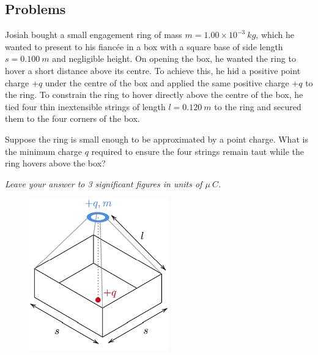 \subsection*{Problems}
\begin{prbm}
Josiah bought a small engagement ring of mass $m = 1.00 \times 10^{-3}\:\unit{kg}$, which he wanted to present to his fianc\'{e}e in a box with a square base of side length $s=0.100\:\unit{m}$ and negligible height. On opening the box, he wanted the ring to hover a short distance above its centre. To achieve this, he hid a positive point charge $+q$ under the centre of the box and applied the same positive charge $+q$ to the ring. To constrain the ring to hover directly above the centre of the box, he tied four thin inextensible strings of length $l=0.120\:\unit{m}$ to the ring and secured them to the four corners of the box. 

Suppose the ring is small enough to be approximated by a point charge. What is the minimum charge $q$ required to ensure the four strings remain taut while the ring hovers above the box?

\textit{Leave your answer to 3 significant figures in units of $\mu\:\unit{C}$.}

\begin{figure}[H]
    \centering
    \includegraphics[width=6cm]{images/A_Simple_Proposal.png}
\end{figure}
\end{prbm}

